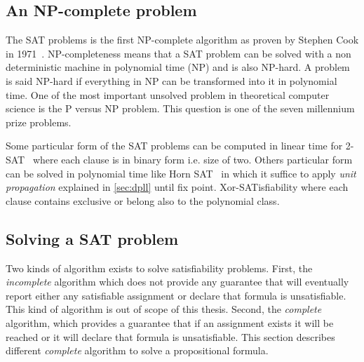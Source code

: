 \subsection{An NP-complete problem}

The SAT problems is the first NP-complete algorithm as proven by Stephen Cook in 1971~\cite{cook1971complexity}.
NP-completeness means that a SAT problem can be solved with a non deterministic machine in polynomial time (NP) and is also NP-hard. A problem is said NP-hard if everything in NP can be transformed into it in polynomial time. 
One of the most important unsolved problem in theoretical computer science is the P versus NP problem.
This question is one of the seven millennium prize problems.

Some particular form of the SAT problems can be computed in linear time for 2-SAT~\cite{aspvall1979linear}
where each clause is in binary form i.e. size  of two. %
Others particular form  can be solved in  polynomial time like Horn SAT~\cite{aspvall1979linear} in which it suffice to  apply \emph{unit propagation} explained in \cref{sec:dpll} until fix point.
Xor-SATisfiability where each clause contains exclusive or belong also to the polynomial class.

%
%


\subsection{Solving a SAT problem}

Two kinds of algorithm exists to solve satisfiability problems.
First, the \emph{incomplete} algorithm which does not provide any guarantee that will eventually report either any satisfiable assignment or declare that formula is unsatisfiable. This kind of algorithm is out of scope of this thesis. 
Second, the \emph{complete} algorithm, which provides a guarantee that if an assignment exists
it will be reached or it will declare that formula is unsatisfiable.
This section describes different \emph{complete }algorithm to solve a propositional formula.




